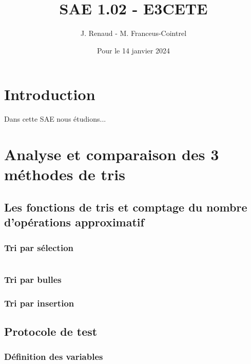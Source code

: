 \documentclass{report}
\title{\textbf{SAE 1.02 - E3CETE}}
\author{J. Renaud - M. Franceus-Cointrel}
\date{Pour le 14 janvier 2024}
\begin{document}
\maketitle
\tableofcontents

\chapter*{Introduction}

\qquad Dans cette SAE nous étudions...




\chapter{Analyse et comparaison des 3 méthodes de tris}

\qquad 

\section{Les fonctions de tris et comptage du nombre d'opérations approximatif}

\subsection{Tri par sélection}

\begin{lstlisting}[language=java, caption={\it Focntion marche aléatoire}, label=code1]
%insert code here
\end{lstlisting}

\subsection{Tri par bulles}

\subsection{Tri par insertion}

\pagebreak



\section{Protocole de test}

\subsection{Définition des variables}
\end{document}
